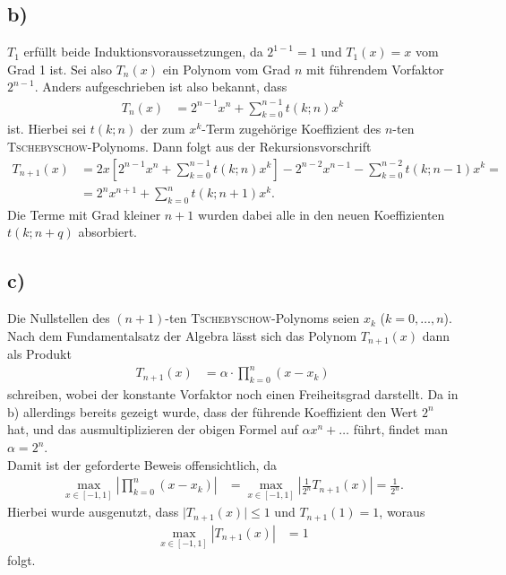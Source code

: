 \documentclass[english, parskip=full]{scrartcl}
\newcommand{\klam}{}
\begin{document}
\subsection*{b)}
$T_1$ erfüllt beide Induktionsvoraussetzungen, da $2^{1-1}=1$ und $T_1(x)=x$ vom Grad 1 ist.
Sei also $T_n(x)$ ein Polynom vom Grad $n$ mit führendem Vorfaktor $2^{n-1}$.
Anders aufgeschrieben ist also bekannt, dass
\begin{align}
T_n(x)&=2^{n-1}x^n + \sum_{k=0}^{n-1}t(k;n)x^k
\end{align}
ist. 
Hierbei sei $t(k;n)$ der zum $x^k$-Term zugehörige Koeffizient des $n$-ten \textsc{Tschebyschow}-Polynoms.
Dann folgt aus der Rekursionsvorschrift
\begin{align}
T_{n+1}(x)&=2x\klam\left[ 2^{n-1}x^n + \sum_{k=0}^{n-1}t(k;n)x^k \right]-2^{n-2}x^{n-1} - \sum_{k=0}^{n-2}t(k;n-1)x^k=\\
&=2^nx^{n+1}+\sum_{k=0}^nt(k;n+1)x^k.
\end{align}
Die Terme mit Grad kleiner $n+1$ wurden dabei alle in den neuen Koeffizienten $t(k;n+q)$ absorbiert.
\subsection*{c)}
Die Nullstellen des $(n+1)$-ten \textsc{Tschebyschow}-Polynoms seien $x_k$ ($k=0,\dots,n$).
Nach dem Fundamentalsatz der Algebra lässt sich das Polynom $T_{n+1}(x)$ dann als Produkt 
\begin{align}
T_{n+1}(x)&=\alpha\cdot\prod_{k=0}^{n}(x-x_k)
\end{align}
schreiben, wobei der konstante Vorfaktor noch einen Freiheitsgrad darstellt.
Da in b) allerdings bereits gezeigt wurde, dass der führende Koeffizient den Wert $2^n$ hat, und das ausmultiplizieren der obigen Formel auf $\alpha x^n+\dots$ führt, findet man $\alpha=2^n$.\\
Damit ist der geforderte Beweis offensichtlich, da
\begin{align}
\underset{x\in [-1,1]}{\max}\left\vert\prod_{k=0}^n(x-x_k)\right\vert&=\underset{x\in [-1,1]}{\max}\left\vert\frac{1}{2^n}T_{n+1}(x)\right\vert=\frac{1}{2^n}.
\end{align}
Hierbei wurde ausgenutzt, dass $\vert T_{n+1}(x)\vert\le 1$ und $T_{n+1}(1)=1$, woraus 
\begin{align}
\underset{x\in [-1,1]}{\max}\left\vert T_{n+1}(x)\right\vert&=1
\end{align}
folgt.
\end{document}
